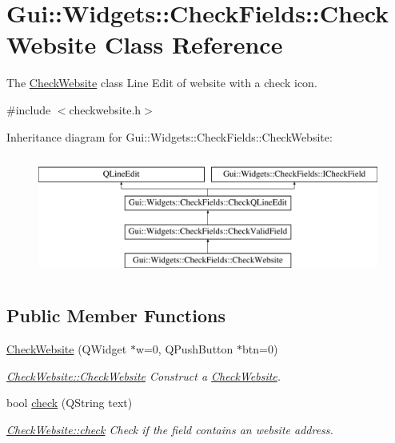 \hypertarget{classGui_1_1Widgets_1_1CheckFields_1_1CheckWebsite}{}\section{Gui\+:\+:Widgets\+:\+:Check\+Fields\+:\+:Check\+Website Class Reference}
\label{classGui_1_1Widgets_1_1CheckFields_1_1CheckWebsite}


The \hyperlink{classGui_1_1Widgets_1_1CheckFields_1_1CheckWebsite}{Check\+Website} class Line Edit of website with a check icon.  




{\ttfamily \#include $<$checkwebsite.\+h$>$}

Inheritance diagram for Gui\+:\+:Widgets\+:\+:Check\+Fields\+:\+:Check\+Website\+:\begin{figure}[H]
\begin{center}
\leavevmode
\includegraphics[height=4.000000cm]{dd/d1b/classGui_1_1Widgets_1_1CheckFields_1_1CheckWebsite}
\end{center}
\end{figure}
\subsection*{Public Member Functions}
\begin{DoxyCompactItemize}
\item 
\hyperlink{classGui_1_1Widgets_1_1CheckFields_1_1CheckWebsite_a9b4c5bef960d5e3d3972d6dc9c10f7cc}{Check\+Website} (Q\+Widget $\ast$w=0, Q\+Push\+Button $\ast$btn=0)
\begin{DoxyCompactList}\small\item\em \hyperlink{classGui_1_1Widgets_1_1CheckFields_1_1CheckWebsite_a9b4c5bef960d5e3d3972d6dc9c10f7cc}{Check\+Website\+::\+Check\+Website} Construct a \hyperlink{classGui_1_1Widgets_1_1CheckFields_1_1CheckWebsite}{Check\+Website}. \end{DoxyCompactList}\item 
bool \hyperlink{classGui_1_1Widgets_1_1CheckFields_1_1CheckWebsite_ad2f5e53b88ca8740fd248dcaab0439bd}{check} (Q\+String text)
\begin{DoxyCompactList}\small\item\em \hyperlink{classGui_1_1Widgets_1_1CheckFields_1_1CheckWebsite_ad2f5e53b88ca8740fd248dcaab0439bd}{Check\+Website\+::check} Check if the field contains an website address. \end{DoxyCompactList}\end{DoxyCompactItemize}
